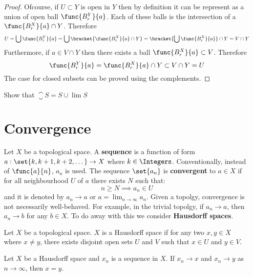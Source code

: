 \begin{proof}
    Ofcourse, if \(U \subset Y\) is open in \(Y\) then by definition it can be represent as a union of open ball \(\func{B_r^Y}{a} \). Each of these balls is the intersection of a \(\func{B_r^X}{a} \cap Y\). Therefore
    \begin{equation*}
        U = \bigcup \func{B_r^Y}{a} = \bigcup \bracket{\func{B_r^X}{a} \cap Y} = \bracket{ \bigcup \func{B_r^X}{a} } \cap Y = V \cap Y
    \end{equation*}
    Furthermore, if \(a \in V \cap Y\) then there exists a ball \(\func{B_r^X}{a} \subset V\). Therefore
    \begin{equation*}
        \func{B_r^Y}{a} = \func{B_r^X}{a} \cap Y \subset V \cap Y = U
    \end{equation*}
    The case for closed subsets can be proved using the complements.
\end{proof}

\begin{exercise}
    \item Show that \(\closure S = S \cup \lim S\)
\end{exercise}
\newpage

\section{Convergence}
Let \(X\) be a topological space. A \textbf{sequence} is a function of form  \( a : \set{k, k+1, k+2, \dots } \to X\) where \(k \in \Integers\). Conventionally, instead of \(\func{a}{n}\), \(a_n\) is used. The sequence \(\set{ a_n}\) is \textbf{convergent} to \(a \in X\) if for all neighbourhood \(U\) of \(a\) there exists \(N\) such that:
\begin{equation*}
    n \geq N \implies a_n \in U
\end{equation*}
and it is denoted by \(a_n \to a\) or \(a = \lim_{n \to \infty}{a_n}\). Given a topolgy, convergence is not necessarily well-behaved. For example, in the trivial topolgy, if \(a_n \to a\), then \(a_n \to b\) for any \(b \in X\). To do away with this we consider \textbf{Hausdorff spaces}.

\begin{definition}
    Let \(X\) be a topological space. \(X\) is a Hausdorff space if for any two \(x,y \in X\) where \(x \neq y\), there exists disjoint open sets \(U\) and \(V\) such that \(x \in U\) and \(y \in V\).
\end{definition}

\begin{proposition}
    Let \(X\) be a Hausdorff space and \(x_n\) is a sequence in \(X\). If \(x_n \to x\) and \(x_n \to y\) as \(n \to \infty\), then \(x = y\).
\end{proposition}

